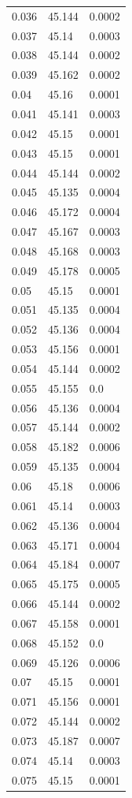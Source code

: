 \begin{table}[H]
\begin{tabular}{lll}
0.036 & 45.144 & 0.0002 \\
0.037 & 45.14 & 0.0003 \\
0.038 & 45.144 & 0.0002 \\
0.039 & 45.162 & 0.0002 \\
0.04 & 45.16 & 0.0001 \\
0.041 & 45.141 & 0.0003 \\
0.042 & 45.15 & 0.0001 \\
0.043 & 45.15 & 0.0001 \\
0.044 & 45.144 & 0.0002 \\
0.045 & 45.135 & 0.0004 \\
0.046 & 45.172 & 0.0004 \\
0.047 & 45.167 & 0.0003 \\
0.048 & 45.168 & 0.0003 \\
0.049 & 45.178 & 0.0005 \\
0.05 & 45.15 & 0.0001 \\
0.051 & 45.135 & 0.0004 \\
0.052 & 45.136 & 0.0004 \\
0.053 & 45.156 & 0.0001 \\
0.054 & 45.144 & 0.0002 \\
0.055 & 45.155 & 0.0 \\
0.056 & 45.136 & 0.0004 \\
0.057 & 45.144 & 0.0002 \\
0.058 & 45.182 & 0.0006 \\
0.059 & 45.135 & 0.0004 \\
0.06 & 45.18 & 0.0006 \\
0.061 & 45.14 & 0.0003 \\
0.062 & 45.136 & 0.0004 \\
0.063 & 45.171 & 0.0004 \\
0.064 & 45.184 & 0.0007 \\
0.065 & 45.175 & 0.0005 \\
0.066 & 45.144 & 0.0002 \\
0.067 & 45.158 & 0.0001 \\
0.068 & 45.152 & 0.0 \\
0.069 & 45.126 & 0.0006 \\
0.07 & 45.15 & 0.0001 \\
0.071 & 45.156 & 0.0001 \\
0.072 & 45.144 & 0.0002 \\
0.073 & 45.187 & 0.0007 \\
0.074 & 45.14 & 0.0003 \\
0.075 & 45.15 & 0.0001 \\

\end{tabular}
\end{table}
